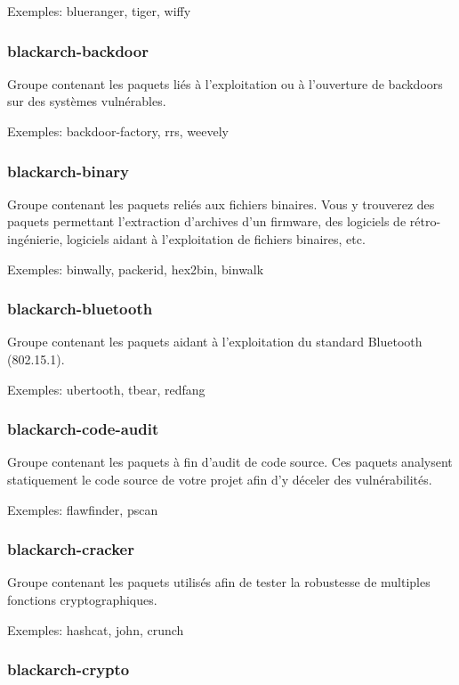 \documentclass[a4paper, oneside, 11pt]{book}
\begin{document}
Exemples: blueranger, tiger, wiffy

\subsubsection{blackarch-backdoor}

Groupe contenant les paquets liés à l'exploitation ou à l'ouverture de
backdoors sur des systèmes vulnérables.

Exemples: backdoor-factory, rrs, weevely

\subsubsection{blackarch-binary}

Groupe contenant les paquets reliés aux fichiers binaires. Vous y trouverez des
paquets permettant l'extraction d'archives d'un firmware, des logiciels de
rétro-ingénierie, logiciels aidant à l'exploitation de fichiers binaires, etc.

Exemples: binwally, packerid, hex2bin, binwalk

\subsubsection{blackarch-bluetooth}

Groupe contenant les paquets aidant à l'exploitation du standard Bluetooth
(802.15.1).

Exemples: ubertooth, tbear, redfang

\subsubsection{blackarch-code-audit}

Groupe contenant les paquets à fin d'audit de code source. Ces paquets analysent
statiquement le code source de votre projet afin d'y déceler des vulnérabilités.

Exemples: flawfinder, pscan

\subsubsection{blackarch-cracker}

Groupe contenant les paquets utilisés afin de tester la robustesse de multiples
fonctions cryptographiques.

Exemples: hashcat, john, crunch

\subsubsection{blackarch-crypto}
\end{document}
